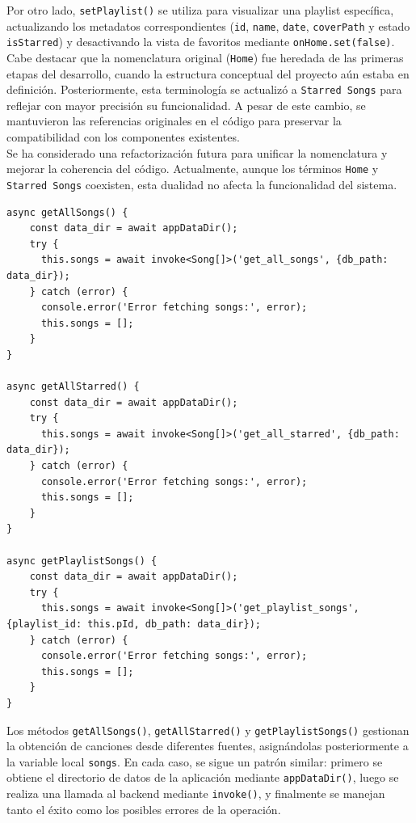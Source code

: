 \documentclass[11pt, a4paper]{article}
\begin{document}
                Por otro lado, \texttt{setPlaylist()} se utiliza para visualizar una playlist específica, actualizando los metadatos correspondientes (\texttt{id}, \texttt{name}, \texttt{date}, \texttt{coverPath} y estado \texttt{isStarred}) y desactivando la vista de favoritos mediante \texttt{onHome.set(false)}. \\

                Cabe destacar que la nomenclatura original (\texttt{Home}) fue heredada de las primeras etapas del desarrollo, cuando la estructura conceptual del proyecto aún estaba en definición. Posteriormente, esta terminología se actualizó a \texttt{Starred Songs} para reflejar con mayor precisión su funcionalidad. A pesar de este cambio, se mantuvieron las referencias originales en el código para preservar la compatibilidad con los componentes existentes. \\

                Se ha considerado una refactorización futura para unificar la nomenclatura y mejorar la coherencia del código. Actualmente, aunque los términos \texttt{Home} y \texttt{Starred Songs} coexisten, esta dualidad no afecta la funcionalidad del sistema. \\

                \begin{lstlisting}[caption={Obtención de playlists}]
async getAllSongs() {
    const data_dir = await appDataDir();
    try {
      this.songs = await invoke<Song[]>('get_all_songs', {db_path: data_dir});
    } catch (error) {
      console.error('Error fetching songs:', error);
      this.songs = [];
    }
}

async getAllStarred() {
    const data_dir = await appDataDir();
    try {
      this.songs = await invoke<Song[]>('get_all_starred', {db_path: data_dir});
    } catch (error) {
      console.error('Error fetching songs:', error);
      this.songs = [];
    }
}

async getPlaylistSongs() {
    const data_dir = await appDataDir();
    try {
      this.songs = await invoke<Song[]>('get_playlist_songs', {playlist_id: this.pId, db_path: data_dir});
    } catch (error) {
      console.error('Error fetching songs:', error);
      this.songs = [];
    }
}
                \end{lstlisting}

                Los métodos \texttt{getAllSongs()}, \texttt{getAllStarred()} y \texttt{getPlaylistSongs()} gestionan la obtención de canciones desde diferentes fuentes, asignándolas posteriormente a la variable local \texttt{songs}. En cada caso, se sigue un patrón similar: primero se obtiene el directorio de datos de la aplicación mediante \texttt{appDataDir()}, luego se realiza una llamada al backend mediante \texttt{invoke()}, y finalmente se manejan tanto el éxito como los posibles errores de la operación. \\
\end{document}
